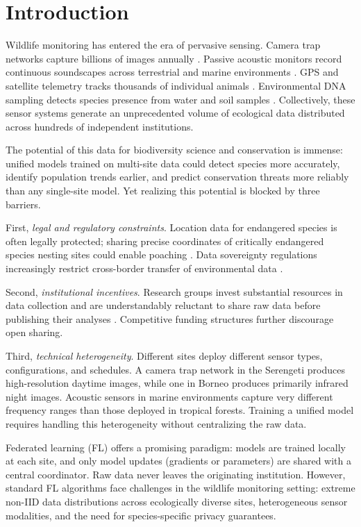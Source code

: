 \documentclass[11pt,a4paper]{article}
\begin{document}
\section{Introduction}
\label{sec:introduction}

Wildlife monitoring has entered the era of pervasive sensing.
Camera trap networks capture billions of images annually \citep{ahumada2020wildlife}.
Passive acoustic monitors record continuous soundscapes across terrestrial and marine environments \citep{gibb2019emerging}.
GPS and satellite telemetry tracks thousands of individual animals \citep{kays2015terrestrial}.
Environmental DNA sampling detects species presence from water and soil samples \citep{deiner2017environmental}.
Collectively, these sensor systems generate an unprecedented volume of ecological data distributed across hundreds of independent institutions.

The potential of this data for biodiversity science and conservation is immense: unified models trained on multi-site data could detect species more accurately, identify population trends earlier, and predict conservation threats more reliably than any single-site model.
Yet realizing this potential is blocked by three barriers.

First, \emph{legal and regulatory constraints}.
Location data for endangered species is often legally protected; sharing precise coordinates of critically endangered species nesting sites could enable poaching \citep{lindenmayer2017do}.
Data sovereignty regulations increasingly restrict cross-border transfer of environmental data \citep{fritz2019citizen}.

Second, \emph{institutional incentives}.
Research groups invest substantial resources in data collection and are understandably reluctant to share raw data before publishing their analyses \citep{tenopir2011data}.
Competitive funding structures further discourage open sharing.

Third, \emph{technical heterogeneity}.
Different sites deploy different sensor types, configurations, and schedules.
A camera trap network in the Serengeti produces high-resolution daytime images, while one in Borneo produces primarily infrared night images.
Acoustic sensors in marine environments capture very different frequency ranges than those deployed in tropical forests.
Training a unified model requires handling this heterogeneity without centralizing the raw data.

Federated learning (FL) \citep{mcmahan2017communication} offers a promising paradigm: models are trained locally at each site, and only model updates (gradients or parameters) are shared with a central coordinator.
Raw data never leaves the originating institution.
However, standard FL algorithms face challenges in the wildlife monitoring setting: extreme non-IID data distributions across ecologically diverse sites, heterogeneous sensor modalities, and the need for species-specific privacy guarantees.
\end{document}
